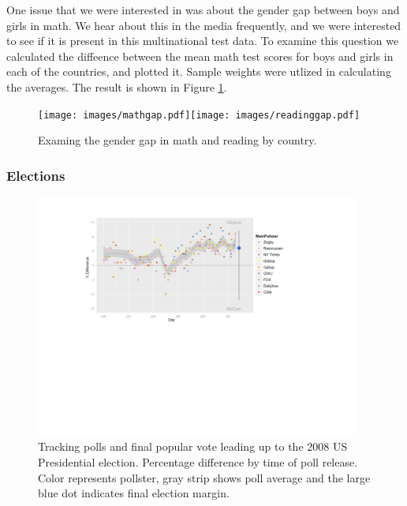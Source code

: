 \documentclass{article}
\begin{document}
One issue that we were interested in was about the gender gap between boys and girls in math. We hear about this in the media frequently, and we were interested to see if it is present in this multinational test data. To examine this question we calculated the diffeence between the mean math test scores for boys and girls in each of the countries, and plotted it. Sample weights were utlized in calculating the averages. The result is shown in Figure \ref{OECD-gender}. 

\begin{figure}[htp]
\centerline{\texttt{[image: images/mathgap.pdf]}\texttt{[image: images/readinggap.pdf]}}
\caption{Examing the gender gap in math and reading by country.}
\label{OECD-gender}
\end{figure}


\subsubsection{Elections}

\begin{figure}[htp]
\centerline{\includegraphics[width=0.95\textwidth]{images/elections.pdf}}
\caption{Tracking polls and final popular vote leading up to the 2008 US Presidential election. Percentage difference by time of poll release. Color represents pollster, gray strip shows poll average and the large blue dot indicates final election margin.}
\label{election}
\end{figure}
\end{document}
